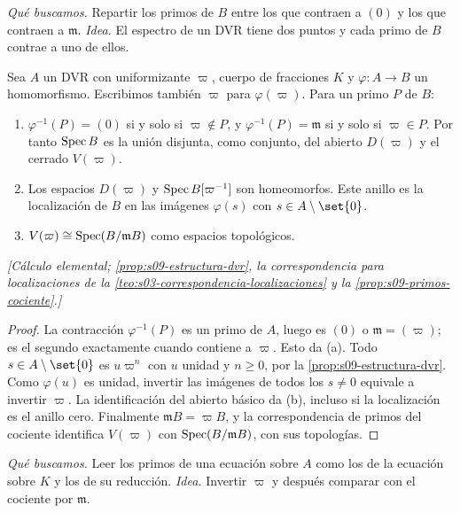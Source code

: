\emph{Qué buscamos.} Repartir los primos de $B$ entre los que contraen a $(0)$ y los que contraen a $\mathfrak m$. \emph{Idea.} El espectro de un DVR tiene dos puntos y cada primo de $B$ contrae a uno de ellos.

\begin{prop}
\label{prop:s09-primos-sobre-dvr}
Sea $A$ un DVR con uniformizante $\varpi$, cuerpo de fracciones $K$ y $\varphi\colon A\to B$ un homomorfismo. Escribimos también $\varpi$ para $\varphi(\varpi)$. Para un primo $P$ de $B$:
\begin{enumerate}[label=(\alph*)]
\item $\varphi^{-1}(P)=(0)$ si y solo si $\varpi\notin P$, y $\varphi^{-1}(P)=\mathfrak m$ si y solo si $\varpi\in P$. Por tanto $\operatorname{Spec} B$ es la unión disjunta, como conjunto, del abierto $D(\varpi)$ y el cerrado $V(\varpi)$.
\item Los espacios $D(\varpi)$ y $\operatorname{Spec} B[\varpi^{-1}]$ son homeomorfos. Este anillo es la localización de $B$ en las imágenes $\varphi(s)$ con $s\in A\setminus\set{0}$.
\item $V(\varpi)\cong\operatorname{Spec}(B/\mathfrak mB)$ como espacios topológicos.
\end{enumerate}
\emph{[Cálculo elemental; \cref{prop:s09-estructura-dvr}, la correspondencia para localizaciones de la \cref{teo:s03-correspondencia-localizaciones} y la \cref{prop:s09-primos-cociente}.]}
\end{prop}
\begin{proof}
La contracción $\varphi^{-1}(P)$ es un primo de $A$, luego es $(0)$ o $\mathfrak m=(\varpi)$; es el segundo exactamente cuando contiene a $\varpi$. Esto da (a). Todo $s\in A\setminus\set{0}$ es $u\varpi^n$ con $u$ unidad y $n\ge0$, por la \cref{prop:s09-estructura-dvr}. Como $\varphi(u)$ es unidad, invertir las imágenes de todos los $s\ne0$ equivale a invertir $\varpi$. La identificación del abierto básico da (b), incluso si la localización es el anillo cero. Finalmente $\mathfrak mB=\varpi B$, y la correspondencia de primos del cociente identifica $V(\varpi)$ con $\operatorname{Spec}(B/\mathfrak mB)$, con sus topologías.
\end{proof}

\emph{Qué buscamos.} Leer los primos de una ecuación sobre $A$ como los de la ecuación sobre $K$ y los de su reducción. \emph{Idea.} Invertir $\varpi$ y después comparar con el cociente por $\mathfrak m$.

